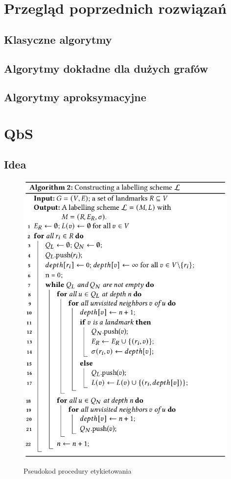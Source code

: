 \documentclass{article}
\theoremstyle{definition}
\begin{document}
    \section{Przegląd poprzednich rozwiązań}
        
    \subsection{Klasyczne algorytmy}

        \subsection{Algorytmy dokładne dla dużych grafów}

        \subsection{Algorytmy aproksymacyjne}

            
    \section{QbS}
    
    \subsection{Idea}

    \begin{figure}[!tbh]
        \includegraphics[width=11cm]{img/algorithm_2.png}
        \centering
        \label{fig:alg2}
        \caption{Pseudokod procedury etykietowania}
    \end{figure}
\end{document}

